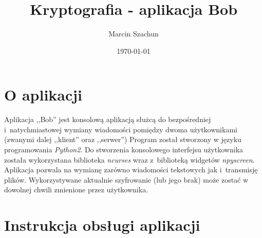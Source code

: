 \documentclass{article}
\title{Kryptografia - aplikacja Bob}
\date{\today}
\author{Marcin Szachun}
\begin{document}
\maketitle
\newpage
{}

\tableofcontents
\newpage

\section{O aplikacji}
  Aplikacja ,,Bob'' jest konsolową aplikacją służcą do bezpośredniej i~natychmiastowej wymiany wiadomości pomiędzy 
  dwoma użytkownikami (zwanymi dalej ,,klient'' oraz ,,serwer'')
  Program został stworzony w języku programowania \emph{Python2}. Do stworzenia konsolowego interfejsu użytkownika
  została wykorzystana biblioteka \emph{ncurses} wraz z~biblioteką widgetów \emph{npyscreen}.
  Aplikacja pozwala na wymianę zarówno wiadomości tekstowych jak i~transmisję plików. Wykorzystywane aktualnie
  szyfrowanie (lub jego brak) może zostać w dowolnej chwili zmienione przez użytkownika. 

\section{Instrukcja obsługi aplikacji}
\end{document}
